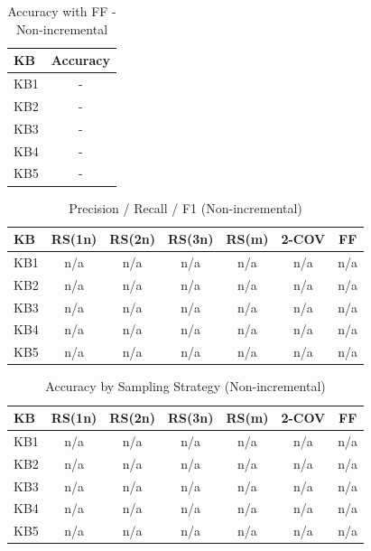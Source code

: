 \begin{table}[htbp]
\centering
\caption{Accuracy with FF - Non-incremental}
\label{tab:table11_non-incremental}
\begin{tabular}{lc}
\toprule
KB & Accuracy \\
\midrule
KB1 & - \\
KB2 & - \\
KB3 & - \\
KB4 & - \\
KB5 & - \\
\bottomrule
\end{tabular}
\end{table}

\begin{table}[htbp]
\centering
\caption{Precision / Recall / F1 (Non-incremental)}
\label{tab:fold_metrics_non-incremental}
\begin{tabular}{lcccccc}
\toprule
KB & RS(1n) & RS(2n) & RS(3n) & RS(m) & 2-COV & FF \\
\midrule
KB1 & n/a & n/a & n/a & n/a & n/a & n/a \\
KB2 & n/a & n/a & n/a & n/a & n/a & n/a \\
KB3 & n/a & n/a & n/a & n/a & n/a & n/a \\
KB4 & n/a & n/a & n/a & n/a & n/a & n/a \\
KB5 & n/a & n/a & n/a & n/a & n/a & n/a \\
\bottomrule
\end{tabular}
\end{table}

\begin{table}[htbp]
\centering
\caption{Accuracy by Sampling Strategy (Non-incremental)}
\label{tab:accuracy_non-incremental}
\begin{tabular}{lcccccc}
\toprule
KB & RS(1n) & RS(2n) & RS(3n) & RS(m) & 2-COV & FF \\
\midrule
KB1 & n/a & n/a & n/a & n/a & n/a & n/a \\
KB2 & n/a & n/a & n/a & n/a & n/a & n/a \\
KB3 & n/a & n/a & n/a & n/a & n/a & n/a \\
KB4 & n/a & n/a & n/a & n/a & n/a & n/a \\
KB5 & n/a & n/a & n/a & n/a & n/a & n/a \\
\bottomrule
\end{tabular}
\end{table}

